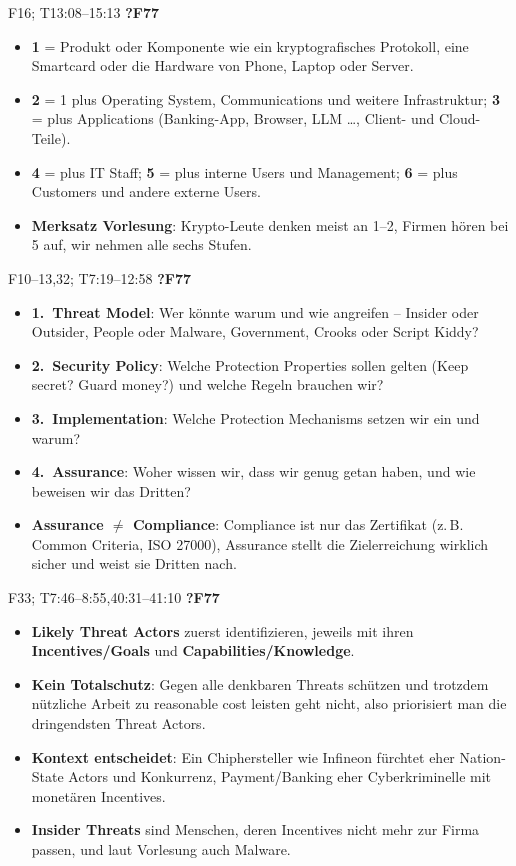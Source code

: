 \documentclass[10pt,a4paper]{article}
\newcommand{\block}[2]{\par\vspace{3pt}{\bfseries #1}\hfill{\scriptsize #2}\par\nopagebreak}
\begin{document}
\block{System: sechs Definitionen -- im Kurs gilt Definition 6}{F16; T13:08--15:13 \quad \textbf{?F77}}
\begin{itemize}
\item \textbf{1} = Produkt oder Komponente wie ein kryptografisches Protokoll, eine Smartcard oder die Hardware von Phone, Laptop oder Server.
\item \textbf{2} = 1 plus Operating System, Communications und weitere Infrastruktur; \textbf{3} = plus Applications (Banking-App, Browser, LLM \dots{}, Client- und Cloud-Teile).
\item \textbf{4} = plus IT Staff; \textbf{5} = plus interne Users und Management; \textbf{6} = plus Customers und andere externe Users.
\item \textbf{Merksatz Vorlesung}: Krypto-Leute denken meist an 1--2, Firmen hören bei 5 auf, wir nehmen alle sechs Stufen.
\end{itemize}
\block{Workflow: vier Schritte in dieser Reihenfolge}{F10--13,32; T7:19--12:58 \quad \textbf{?F77}}
\begin{itemize}
\item \textbf{1.\ Threat Model}: Wer könnte warum und wie angreifen -- Insider oder Outsider, People oder Malware, Government, Crooks oder Script Kiddy?
\item \textbf{2.\ Security Policy}: Welche Protection Properties sollen gelten (Keep secret? Guard money?) und welche Regeln brauchen wir?
\item \textbf{3.\ Implementation}: Welche Protection Mechanisms setzen wir ein und warum?
\item \textbf{4.\ Assurance}: Woher wissen wir, dass wir genug getan haben, und wie beweisen wir das Dritten?
\item \textbf{Assurance $\neq$ Compliance}: Compliance ist nur das Zertifikat (z.\,B. Common Criteria, ISO 27000), Assurance stellt die Zielerreichung wirklich sicher und weist sie Dritten nach.
\end{itemize}
\block{Threat Model: warum wichtig?}{F33; T7:46--8:55,40:31--41:10 \quad \textbf{?F77}}
\begin{itemize}
\item \textbf{Likely Threat Actors} zuerst identifizieren, jeweils mit ihren \textbf{Incentives/Goals} und \textbf{Capabilities/Knowledge}.
\item \textbf{Kein Totalschutz}: Gegen alle denkbaren Threats schützen und trotzdem nützliche Arbeit zu reasonable cost leisten geht nicht, also priorisiert man die dringendsten Threat Actors.
\item \textbf{Kontext entscheidet}: Ein Chiphersteller wie Infineon fürchtet eher Nation-State Actors und Konkurrenz, Payment/Banking eher Cyberkriminelle mit monetären Incentives.
\item \textbf{Insider Threats} sind Menschen, deren Incentives nicht mehr zur Firma passen, und laut Vorlesung auch Malware.
\end{itemize}
\end{document}
